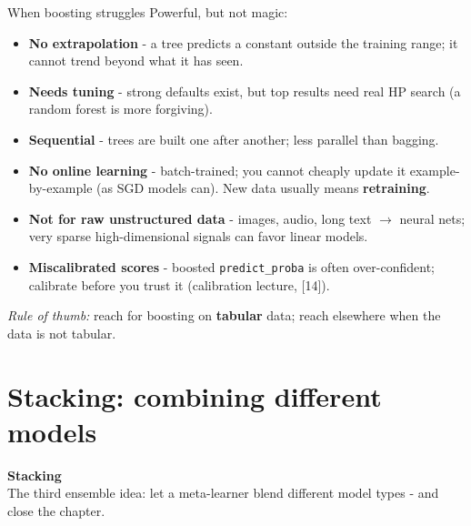 \documentclass[aspectratio=169]{beamer}
\newcommand{\sectiontransition}[2]{%
  \begin{frame}[plain]
    \vfill
    \begin{center}
      {\Large\color{popblue}\textbf{#1}}\\[10pt]
      {\normalsize #2}
    \end{center}
    \vfill
  \end{frame}}
\begin{document}
\begin{frame}{When boosting struggles}
  Powerful, but not magic:
  \begin{itemize}\small
    \item \textbf{No extrapolation} - a tree predicts a constant outside the training range; it
      cannot trend beyond what it has seen.
    \item \textbf{Needs tuning} - strong defaults exist, but top results need real HP search
      (a random forest is more forgiving).
    \item \textbf{Sequential} - trees are built one after another; less parallel than bagging.
    \item \textbf{No online learning} - batch-trained; you cannot cheaply update it
      example-by-example (as SGD models can). New data usually means \textbf{retraining}.
    \item \textbf{Not for raw unstructured data} - images, audio, long text $\to$ neural nets;
      very sparse high-dimensional signals can favor linear models.
    \item \textbf{Miscalibrated scores} - boosted \texttt{predict\_proba} is often over-confident;
      calibrate before you trust it (calibration lecture, [14]).
  \end{itemize}
  \vfill
  \footnotesize \emph{Rule of thumb:} reach for boosting on \textbf{tabular} data; reach elsewhere
  when the data is not tabular.
\end{frame}

\section{Stacking: combining different models}
\sectiontransition{Stacking}{The third ensemble idea: let a meta-learner blend different model types - and close the chapter.}
\end{document}
